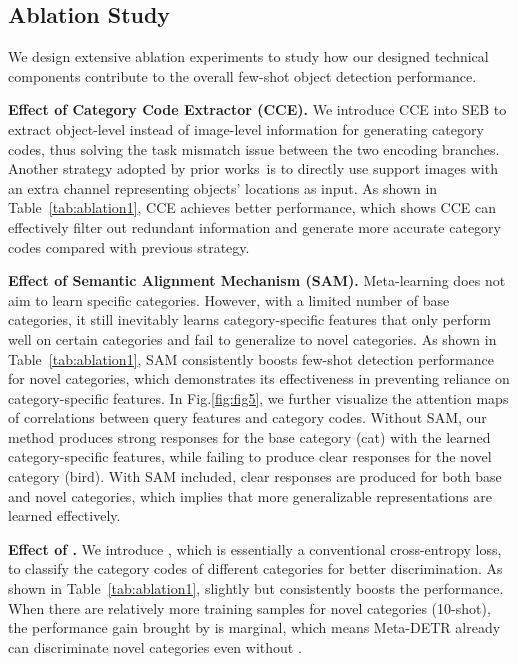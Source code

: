 \documentclass[10pt,twocolumn,letterpaper]{article}
\begin{document}
\subsection{Ablation Study}  \label{sec:ablation}
\vspace*{-1.0mm}
We design extensive ablation experiments to study how our designed technical components contribute to the overall few-shot object detection performance.

\smallskip
\noindent
\textbf{Effect of Category Code Extractor (CCE).}
We introduce CCE into SEB to extract object-level instead of image-level information for generating category codes, thus solving the task mismatch issue between the two encoding branches. Another strategy adopted by prior works\,\cite{FewshotReweighting,metarcnn,FSDetView} is to directly use support images with an extra channel representing objects' locations as input. As shown in Table~\ref{tab:ablation1}, CCE achieves better performance, which shows CCE can effectively filter out redundant information and generate more accurate category codes compared with previous strategy.




\smallskip
\noindent
\textbf{Effect of Semantic Alignment Mechanism (SAM).}
Meta-learning does not aim to learn specific categories. However, with a limited number of base categories, it still inevitably learns category-specific features that only perform well on certain categories and fail to generalize to novel categories. As shown in Table~\ref{tab:ablation1}, SAM consistently boosts few-shot detection performance for novel categories, which demonstrates its effectiveness in preventing reliance on category-specific features. In Fig.\;\ref{fig:fig5}, we further visualize the attention maps of correlations between query features and category codes. Without SAM, our method produces strong responses for the base category (cat) with the learned category-specific features, while failing to produce clear responses for the novel category (bird). With SAM included, clear responses are produced for both base and novel categories, which implies that more generalizable representations are learned effectively.


\smallskip
\noindent
\textbf{Effect of \boldmath .}
We introduce , which is essentially a conventional cross-entropy loss, to classify the category codes of different categories for better discrimination. As shown in Table~\ref{tab:ablation1},  slightly but consistently boosts the performance. When there are relatively more training samples for novel categories (10-shot), the performance gain brought by  is marginal, which means Meta-DETR already can discriminate novel categories even without .
\end{document}
